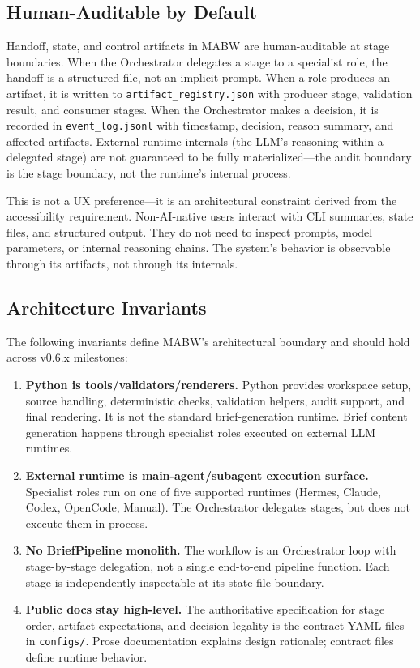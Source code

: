 \documentclass[11pt,a4paper]{article}
\begin{document}
\subsection{Human-Auditable by Default}

Handoff, state, and control artifacts in MABW are human-auditable at stage boundaries. When the Orchestrator delegates a stage to a specialist role, the handoff is a structured file, not an implicit prompt. When a role produces an artifact, it is written to \texttt{artifact\_registry.json} with producer stage, validation result, and consumer stages. When the Orchestrator makes a decision, it is recorded in \texttt{event\_log.jsonl} with timestamp, decision, reason summary, and affected artifacts. External runtime internals (the LLM's reasoning within a delegated stage) are not guaranteed to be fully materialized---the audit boundary is the stage boundary, not the runtime's internal process.

This is not a UX preference---it is an architectural constraint derived from the accessibility requirement. Non-AI-native users interact with CLI summaries, state files, and structured output. They do not need to inspect prompts, model parameters, or internal reasoning chains. The system's behavior is observable through its artifacts, not through its internals.

\subsection{Architecture Invariants}

The following invariants define MABW's architectural boundary and should hold across v0.6.x milestones:

\begin{enumerate}[leftmargin=*,itemsep=2pt]
    \item \textbf{Python is tools/validators/renderers.} Python provides workspace setup, source handling, deterministic checks, validation helpers, audit support, and final rendering. It is not the standard brief-generation runtime. Brief content generation happens through specialist roles executed on external LLM runtimes.
    \item \textbf{External runtime is main-agent/subagent execution surface.} Specialist roles run on one of five supported runtimes (Hermes, Claude, Codex, OpenCode, Manual). The Orchestrator delegates stages, but does not execute them in-process.
    \item \textbf{No BriefPipeline monolith.} The workflow is an Orchestrator loop with stage-by-stage delegation, not a single end-to-end pipeline function. Each stage is independently inspectable at its state-file boundary.
    \item \textbf{Public docs stay high-level.} The authoritative specification for stage order, artifact expectations, and decision legality is the contract YAML files in \texttt{configs/}. Prose documentation explains design rationale; contract files define runtime behavior.
\end{enumerate}
\end{document}
